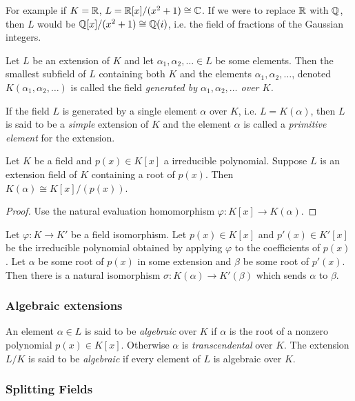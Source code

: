 \documentclass[11pt,letterpaper]{article}
\begin{document}
\begin{appendices}
For example if $K=\mathbb{R}$, $L=\mathbb{R}[x]/(x^2+1)\cong \mathbb{C}$. If we were to replace $\mathbb{R}$ with $\mathbb{Q}$, then $L$ would be $\mathbb{Q}[x]/(x^2+1)\cong \mathbb{Q}(i)$, i.e. the field of fractions of the Gaussian integers. 

\begin{definition}
    Let $L$ be an extension of $K$ and let $\alpha_1,\alpha_2,\ldots\in L$ be some elements. Then the smallest subfield of $L$ containing both $K$ and the elements $\alpha_1,\alpha_2,\ldots$, denoted $K(\alpha_1,\alpha_2,\ldots)$ is called the field \emph{generated by $\alpha_1,\alpha_2,\ldots$ over $K$.}
\end{definition}

\begin{definition}
    If the field $L$ is generated by a single element $\alpha$ over $K$, i.e. $L=K(\alpha)$, then $L$ is said to be a \emph{simple} extension of $K$ and the element $\alpha$ is called a \emph{primitive element} for the extension. 
\end{definition}

\begin{theorem}
    Let $K$ be a field and $p(x)\in K[x]$ a irreducible polynomial. Suppose $L$ is an extension field of $K$ containing a root of $p(x)$. Then $K(\alpha)\cong K[x]/(p(x))$.
\end{theorem}
\begin{proof}
    Use the natural evaluation homomorphism $\varphi : K[x] \to K(\alpha)$.
\end{proof}

\begin{theorem}
    Let $\varphi : K \to K'$ be a field isomorphism. Let $p(x)\in K[x]$ and $p'(x)\in K'[x]$ be the irreducible polynomial obtained by applying $\varphi$ to the coefficients of $p(x)$. Let $\alpha$ be some root of $p(x)$ in some extension and $\beta$ be some root of $p'(x)$. Then there is a natural isomorphism $\sigma : K(\alpha) \to K'(\beta)$ which sends $\alpha$ to $\beta$.
\end{theorem}

\subsubsection{Algebraic extensions}

\begin{definition}
    An element $\alpha\in L$ is said to be \emph{algebraic} over $K$ if $\alpha$ is the root of a nonzero polynomial $p(x)\in K[x]$. Otherwise $\alpha$ is \emph{transcendental} over $K$. The extension $L/K$ is said to be \emph{algebraic} if every element of $L$ is algebraic over $K$.
\end{definition}

\subsubsection{Splitting Fields}
\end{appendices}
\end{document}
